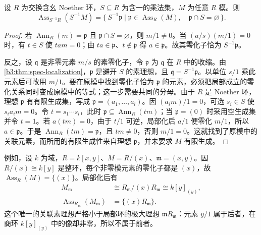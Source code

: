 \begin{proposition}\label{b3:prop:associated-localization}
	设 \(R\) 为交换含幺 Noether 环，\(S\subseteq R\) 为含一的乘法集，\(M\) 为任意 \(R\) 模。则
	\[
		\operatorname{Ass}_{S^{-1}R}(S^{-1}M) =\bigl\{\,S^{-1}\mathfrak p\mid \mathfrak p\in\operatorname{Ass}_R(M),\quad \mathfrak p\cap S=\varnothing\,\bigr\}.
	\]
\end{proposition}
\begin{proof}
	若 \(\operatorname{Ann}_R(m)=\mathfrak p\) 且 \(\mathfrak p\cap S=\varnothing\)，则 \(m/1\ne0\)。当 \((a/s)(m/1)=0\) 时，有 \(t\in S\) 使 \(tam=0\)；由 \(ta\in\mathfrak p\)、\(t\notin\mathfrak p\) 得 \(a\in\mathfrak p\)。故其零化子恰为 \(S^{-1}\mathfrak p\)。

	反之，设 \(\mathfrak q\) 是非零元素 \(m/s\) 的素零化子，令 \(\mathfrak p\) 为 \(\mathfrak q\) 在 \(R\) 中的收缩。由\cref{b3:thm:spec-localization}，\(\mathfrak p\) 是避开 \(S\) 的素理想，且 \(\mathfrak q=S^{-1}\mathfrak p\)。以单位 \(s/1\) 乘此元素后可改用 \(m/1\)。要在原模中找到零化子恰为 \(\mathfrak p\) 的元素，必须把局部成立的零化关系同时变成原模中的等式；这一步需要共同的分母。由于 \(R\) 是 Noether 环，理想 \(\mathfrak p\) 有有限生成集，写成 \(\mathfrak p=(a_1,\ldots,a_l)\)。因 \((a_i m)/1=0\)，可选 \(s_i\in S\) 使 \(s_i a_i m=0\)。令 \(t=s_1\cdots s_l\)，此时 \(\mathfrak p\subseteq\operatorname{Ann}_R(tm)\)；当 \(\mathfrak p=(0)\) 时采用空生成集并令 \(t=1\)。若 \(a(tm)=0\)，由于 \(t/1\) 可逆，局部化后 \(a/1\) 便零化 \(m/1\)，所以 \(a\in\mathfrak p\)。于是 \(\operatorname{Ann}_R(tm)=\mathfrak p\)，且 \(tm\ne0\)，否则 \(m/1=0\)。这就找到了原模中的关联元素，而所用的有限生成性来自理想 \(\mathfrak p\)，并未要求 \(M\) 有限生成。
\end{proof}

例如，设 \(k\) 为域，\(R=k[x,y]\)、\(M=R/(x)\)、\(\mathfrak m=(x,y)\)。因 \(R/(x)\cong k[y]\) 是整环，每个非零模元素的零化子都是 \((x)\)，故 \(\operatorname{Ass}_R(M)=\{(x)\}\)。局部化后有
\[
	\begin{aligned}
		M_{\mathfrak m}&\cong R_{\mathfrak m}/(x)R_{\mathfrak m} \cong k[y]_{(y)},\\
		\operatorname{Ass}_{R_{\mathfrak m}}(M_{\mathfrak m}) &=\{(x)R_{\mathfrak m}\}.
	\end{aligned}
\]
这个唯一的关联素理想严格小于局部环的极大理想 \(\mathfrak mR_{\mathfrak m}\)：元素 \(y/1\) 属于后者，在商环 \(k[y]_{(y)}\) 中的像却非零，所以不属于前者。


